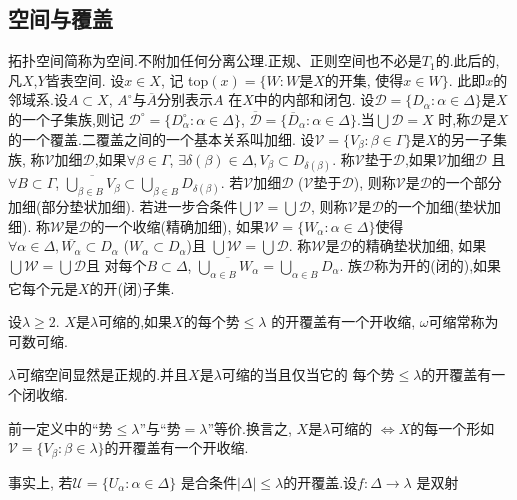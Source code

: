 \documentclass[main.tex]{subfiles}
\begin{document}
\subsection{空间与覆盖}\label{ch1.1.2}
拓扑空间简称为空间.不附加任何分离公理.正规、正则空间也不必是$T_1$的.此后的,凡$X$,$Y$皆表空间.
设$x\in X$, 记
	top$(x) = \{W: W$是$X$的开集, 使得$ x\in W\}$.
此即$x$的邻域系.设$A\subset X$, $A^\circ$与$\overline{A}$分别表示$A$ 在$X$中的内部和闭包.
设$\mathscr{D}=\{D_\alpha:\alpha\in\Delta\}$是$X$的一个子集族,则记
$\mathscr{D}^\circ=\{D^\circ_\alpha:\alpha\in\Delta\}$,
$\overline{\mathscr{D}}=\{\overline{D}_\alpha:\alpha\in\Delta\}$.当$\bigcup\mathscr{D} = X$
时,称$\mathscr{D}$是$X$的一个覆盖.二覆盖之间的一个基本关系叫加细.
设$\mathscr{V}=\{V_\beta:\beta\in\Gamma\}$是$X$的另一子集族,
称$\mathscr{V}$加细$\mathscr{D}$,如果$\forall\beta\in\Gamma$, 
$\exists \delta(\beta)\in\Delta, V_\beta\subset D_{\delta(\beta)}$.
称$\mathscr{V}$垫于$\mathscr{D}$,如果$\mathscr{V}$加细$\mathscr{D}$
且$\forall B\subset\Gamma$, 
$\overline{\bigcup_{\beta\in B}V_\beta}\subset \bigcup_{\beta\in B}D_{\delta(\beta)}$.
若$\mathscr{V}$加细$\mathscr{D}$
($\mathscr{V}$垫于$\mathscr{D}$),
则称$\mathscr{V}$是$\mathscr{D}$的一个部分加细(部分垫状加细).
若进一步合条件$\bigcup\mathscr{V}=\bigcup\mathscr{D}$,
则称$\mathscr{V}$是$\mathscr{D}$的一个加细(垫状加细).
称$\mathscr{W}$是$\mathscr{D}$的一个收缩(精确加细),
如果$\mathscr{W}=\{W_\alpha: \alpha\in\Delta\}$使得
$\forall\alpha\in \Delta, \overline{W_\alpha}\subset D_\alpha$
($W_\alpha\subset D_\alpha$)且
$\bigcup\mathscr{W}  = \bigcup \mathscr{D}$.
称$\mathscr{W}$是$\mathscr{D}$的精确垫状加细,
如果$\bigcup\mathscr{W}  = \bigcup \mathscr{D}$且
对每个$B\subset \Delta$, 
$\overline{\bigcup_{\alpha\in B}W_\alpha}  = \bigcup_{\alpha\in B}D_\alpha$.
族$\mathscr{D}$称为开的(闭的),如果它每个元是$X$的开(闭)子集.

\begin{definition}
设$\lambda \ge2$. $X$是$\lambda$可缩的,如果$X$的每个势$\le \lambda$
的开覆盖有一个开收缩, $\omega$可缩常称为可数可缩.
\end{definition}
$\lambda$可缩空间显然是正规的.并且$X$是$\lambda$可缩的当且仅当它的
每个势$\le \lambda$的开覆盖有一个闭收缩.

\begin{note}\begin{songti}
前一定义中的“势$\le \lambda$”与“势$= \lambda$”等价.换言之,
$X$是$\lambda$可缩的 $\Leftrightarrow X$的每一个形如
$\mathscr{V}=\{V_\beta: \beta\in\lambda\}$的开覆盖有一个开收缩. 

事实上, 若$\mathscr{U}=\{U_\alpha: \alpha\in\Delta\}$
是合条件$|\Delta|\le\lambda$的开覆盖.设$f: \Delta\to\lambda$
是双射
\end{songti}
\end{note}
\end{document}
